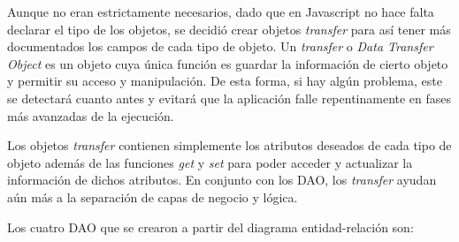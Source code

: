 \documentclass[11pt]{book}
\begin{document}
	Aunque no eran estrictamente necesarios, dado que en Javascript no hace falta declarar el tipo de los objetos, se decidió crear objetos \emph{transfer} para así tener más documentados los campos de cada tipo de objeto.
	Un \emph{transfer} o \emph{Data Transfer Object} es un objeto cuya única función es guardar la información de cierto objeto y permitir su acceso y manipulación.
	De esta forma, si hay algún problema, este se detectará cuanto antes y evitará que la aplicación falle repentinamente en fases más avanzadas de la ejecución.
	
	Los objetos \emph{transfer} contienen simplemente los atributos deseados de cada tipo de objeto además de las funciones \emph{get} y \emph{set} para poder acceder y actualizar la información de dichos atributos.
	En conjunto con los DAO, los \emph{transfer} ayudan aún más a la separación de capas de negocio y lógica.
	
	Los cuatro DAO que se crearon a partir del diagrama entidad-relación son:
	
\end{document}
